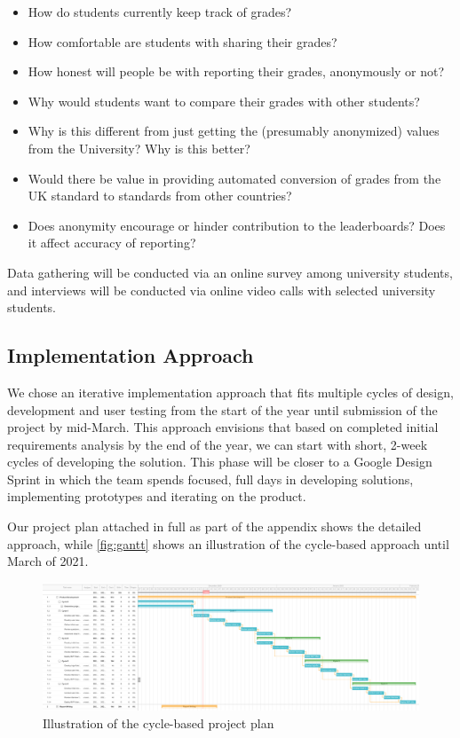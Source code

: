 \begin{itemize}
    \item How do students currently keep track of grades?
    \item How comfortable are students with sharing their grades?
    \item How honest will people be with reporting their grades, anonymously or not?
    \item Why would students want to compare their grades with other students?
    \item Why is this different from just getting the (presumably anonymized) values from the University? Why is this better?
    \item Would there be value in providing automated conversion of grades from the UK standard to standards from other countries?
    \item Does anonymity encourage or hinder contribution to the leaderboards? Does it affect accuracy of reporting?
\end{itemize}

Data gathering will be conducted via an online survey among university students, and interviews will be conducted via online video calls with selected university students.

\subsection{Implementation Approach}

We chose an iterative implementation approach that fits multiple cycles of design, development and user testing from the start of the year until submission of the project by mid-March. This approach envisions that based on completed initial requirements analysis by the end of the year, we can start with short, 2-week cycles of developing the solution. This phase will be closer to a Google Design Sprint in which the team spends focused, full days in developing solutions, implementing prototypes and iterating on the product.

Our project plan attached in full as part of the appendix shows the detailed approach, while \autoref{fig:gantt} shows an illustration of the cycle-based approach until March of 2021.

\begin{figure}[H]
    \centering
\includegraphics[width=\textwidth]{images/gantt.png}
    \caption{Illustration of the cycle-based project plan}
    \label{fig:gantt}
\end{figure}

